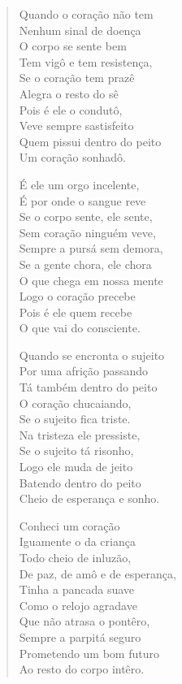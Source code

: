 \begin{verse}
Quando o coração não tem\\
Nenhum sinal de doença\\
O corpo se sente bem\\
Tem vigô e tem resistença,\\
Se o coração tem prazê\\
Alegra o resto do sê\\
Pois é ele o condutô,\\
Veve sempre sastisfeito\\
Quem pissui dentro do peito\\
Um coração sonhadô.

É ele um orgo incelente,\\
É por onde o sangue reve\\
Se o corpo sente, ele sente,\\
Sem coração ninguém veve,\\
Sempre a pursá sem demora,\\
Se a gente chora, ele chora\\
O que chega em nossa mente\\
Logo o coração precebe\\
Pois é ele quem recebe\\
O que vai do consciente.

Quando se encronta o sujeito\\
Por uma afrição passando\\
Tá também dentro do peito\\
O coração chucaiando,\\
Se o sujeito fica triste.\\
Na tristeza ele pressiste,\\
Se o sujeito tá risonho,\\
Logo ele muda de jeito\\
Batendo dentro do peito\\
Cheio de esperança e sonho.

Conheci um coração\\
Iguamente o da criança\\
Todo cheio de inluzão,\\
De paz, de amô e de esperança,\\
Tinha a pancada suave\\
Como o relojo agradave\\
Que não atrasa o pontêro,\\
Sempre a parpitá seguro\\
Prometendo um bom futuro\\
Ao resto do corpo intêro.


\end{verse}
